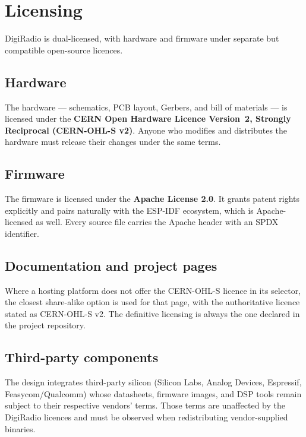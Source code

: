 \chapter{Licensing}
\label{ch:licensing}

DigiRadio is dual-licensed, with hardware and firmware under separate but
compatible open-source licences.

\section{Hardware}

The hardware --- schematics, PCB layout, Gerbers, and bill of materials
--- is licensed under the \textbf{CERN Open Hardware Licence Version~2,
Strongly Reciprocal (CERN-OHL-S v2)}. Anyone who modifies and distributes
the hardware must release their changes under the same terms.

\section{Firmware}

The firmware is licensed under the \textbf{Apache License 2.0}. It grants
patent rights explicitly and pairs naturally with the ESP-IDF ecosystem,
which is Apache-licensed as well. Every source file carries the Apache
header with an SPDX identifier.

\section{Documentation and project pages}

Where a hosting platform does not offer the CERN-OHL-S licence in its
selector, the closest share-alike option is used for that page, with the
authoritative licence stated as CERN-OHL-S v2. The definitive licensing
is always the one declared in the project repository.

\section{Third-party components}

The design integrates third-party silicon (Silicon Labs, Analog Devices,
Espressif, Feasycom/Qualcomm) whose datasheets, firmware images, and DSP
tools remain subject to their respective vendors' terms. Those terms are
unaffected by the DigiRadio licences and must be observed when
redistributing vendor-supplied binaries.
